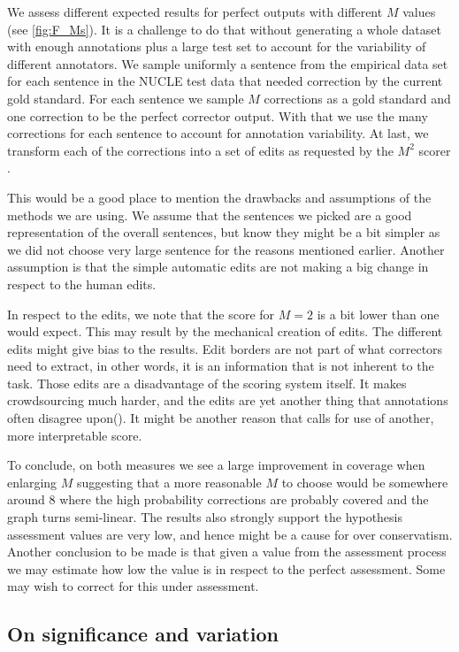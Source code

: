 \documentclass[letter,11pt]{article}
\begin{document}
 We assess different expected results for perfect outputs with different $M$ values (see \ref{fig:F_Ms}).
 It is a challenge to do that without generating a whole dataset with enough annotations plus a large test
 set to account for the variability of different annotators. We sample uniformly a sentence from the
 empirical data set for each sentence in the NUCLE test data that needed correction by the current gold standard.
 For each sentence we sample $M$ corrections as a gold standard and one correction to be the perfect corrector
 output. With that we use the many corrections for each sentence to account for annotation variability.
 At last, we transform each of the corrections into a set of edits as requested
 by the $M^2$ scorer \cite{dahlmeier2012better}.  

This would be a good place to mention the drawbacks and assumptions of the methods we are using. We assume that the sentences we picked are a good representation of the overall sentences, but know they might be a bit simpler as we did not choose very large sentence for the reasons mentioned earlier. Another assumption is that the simple automatic edits are not making a big change in respect to the human edits.

In respect to the edits, we note that the score for $M=2$ is a bit lower than one would expect. This may result by the mechanical creation of edits. The different edits might give bias to the results. Edit borders are not part of what correctors need to extract, in other words, it is an information that is not inherent to the task. Those edits are a disadvantage of the scoring system itself. It makes crowdsourcing much harder, and the edits are yet another thing that annotations often disagree upon(\cite{dahlmeier2012better}). It might be another reason that calls for use of another, more interpretable score.

To conclude, on both measures we see a large improvement in coverage when enlarging $M$ suggesting that a more reasonable $M$ to choose would be somewhere around 8 where the high probability corrections are probably covered and the graph turns semi-linear. The results also strongly support the hypothesis assessment values are very low, and hence might be a cause for over conservatism.
 Another conclusion to be made is that given a value from the assessment process we may estimate how low the value is in respect to the perfect assessment. Some may wish to correct for this under assessment.

\subsection{On significance and variation}
\end{document}
